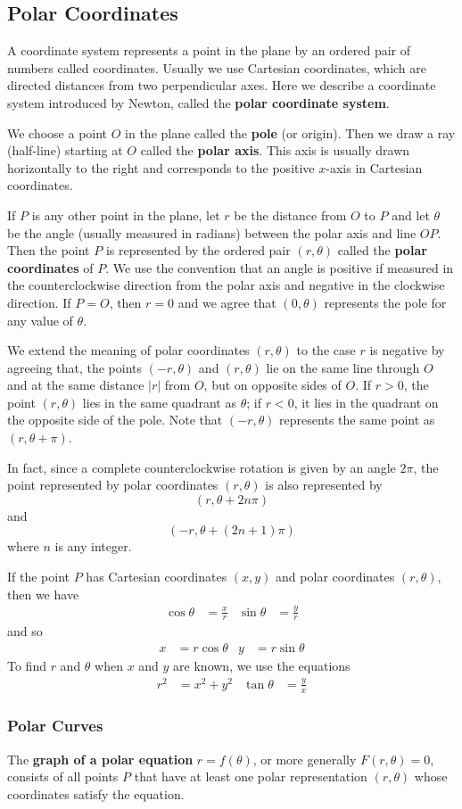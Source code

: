\subsection{Polar Coordinates}

A coordinate system represents a point in the plane by an ordered pair of
numbers called coordinates.
Usually we use Cartesian coordinates, which are directed distances from two
perpendicular axes.
Here we describe a coordinate system introduced by Newton, called the
\textbf{polar coordinate system}.

We choose a point \(O\) in the plane called the \textbf{pole} (or origin).
Then we draw a ray (half-line) starting at \(O\) called the
\textbf{polar axis}.
This axis is usually drawn horizontally to the right and
corresponds to the positive \(x\)-axis in Cartesian coordinates.

If \(P\) is any other point in the plane, let \(r\) be the distance from \(O\)
to \(P\) and let \(\theta\) be the angle  (usually measured in radians)
between the polar axis and line \(OP\).
Then the point \(P\) is represented by the ordered pair \((r,\theta)\) called
the \textbf{polar coordinates} of \(P\).
We use the convention that an angle is positive if measured in the
counterclockwise direction from the polar axis and negative in the clockwise
direction.
If \(P=O\), then \(r=0\) and we agree that \((0,\theta)\) represents the pole
for any value of \(\theta\).

We extend the meaning of polar coordinates \((r,\theta)\) to the case \(r\) is
negative by agreeing that, the points \((-r,\theta)\) and \((r,\theta)\) lie
on the same line through \(O\) and at the same distance \(|r|\) from \(O\),
but on opposite sides of \(O\).
If \(r>0\), the point \((r,\theta)\) lies in the same quadrant as \(\theta\);
if \(r<0\), it lies in the quadrant on the opposite side of the pole.
Note that \((-r,\theta)\) represents the same point as \((r,\theta+\pi)\).

In fact, since a complete counterclockwise rotation is given by an angle
\(2\pi\), the point represented by polar coordinates \((r,\theta)\) is also
represented by
\[(r,\theta+2n\pi)\]
and
\[(-r,\theta+(2n+1)\pi)\]
where \(n\) is any integer.

If the point \(P\) has Cartesian coordinates \((x,y)\) and polar
coordinates \((r,\theta)\), then we have
\begin{align*}
    \cos\theta &= \frac{x}{r} & \sin\theta &= \frac{y}{r}
\end{align*}
and so
\begin{align*}
    x &= r\cos\theta & y &= r\sin\theta
\end{align*}
To find \(r\) and \(\theta\) when \(x\) and \(y\) are known, we use the
equations
\begin{align*}
    r^2 &= x^2+y^2 & \tan\theta &= \frac{y}{x}
\end{align*}

\subsubsection*{Polar Curves}

The \textbf{graph of a polar equation} \(r=f(\theta)\), or more generally
\(F(r,\theta)=0\), consists of all points \(P\) that have at least one polar
representation \((r,\theta)\) whose coordinates satisfy the equation.